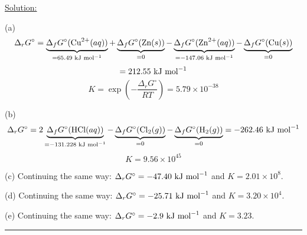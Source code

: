\noindent
\underline{Solution:}

(a) $$\Delta_rG^\circ = \mathop {\underbrace{\Delta_fG^\circ(\textnormal{Cu}^{2+}(aq))}}\limits_{=65.49\textnormal{ kJ mol}^{-1}} + \mathop {\underbrace{\Delta_fG^\circ(\textnormal{Zn}(s))}}\limits_{=0} - \mathop {\underbrace{\Delta_fG^\circ(\textnormal{Zn}^{2+}(aq))}}\limits_{= -147.06\textnormal{ kJ mol}^{-1}} - \mathop {\underbrace{\Delta_fG^\circ(\textnormal{Cu}(s))}}\limits_{=0}$$
$$ = 212.55\textnormal{ kJ mol}^{-1}$$
$$K = \exp\left(-\frac{\Delta_rG^\circ}{RT}\right) = 5.79\times 10^{-38}$$

(b) $$\Delta_rG^\circ = 2\mathop {\underbrace{\Delta_fG^\circ(\textnormal{HCl}(aq))}}\limits_{=-131.228\textnormal{ kJ mol}^{-1}} - \mathop {\underbrace{\Delta_fG^\circ(\textnormal{Cl}_2(g))}}\limits_{=0} - \mathop {\underbrace{\Delta_fG^\circ(\textnormal{H}_2(g))}}\limits_{= 0} = -262.46\textnormal{ kJ mol}^{-1}$$
$$K = 9.56\times 10^{45}$$

(c) Continuing the same way: $\Delta_rG^\circ = -47.40\textnormal{ kJ mol}^{-1}$ and $K = 2.01\times 10^8$.

(d) Continuing the same way: $\Delta_rG^\circ = -25.71\textnormal{ kJ mol}^{-1}$ and $K = 3.20\times 10^4$.

(e) Continuing the same way: $\Delta_rG^\circ = -2.9\textnormal{ kJ mol}^{-1}$ and $K = 3.23$.

\hrule\vspace{0.5cm}
